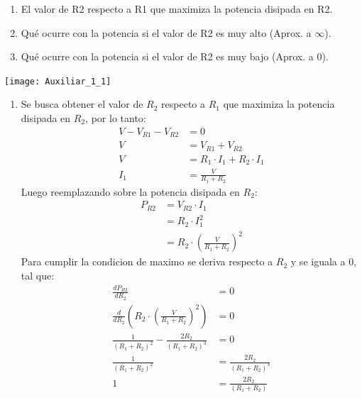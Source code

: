 \documentclass[
  11pt,
  letterpaper,
   addpoints,
  ]{exam}
\begin{document}
\begin{questions}
    \begin{enumerate}
        \item El valor de R2 respecto a R1 que maximiza la potencia disipada en R2.
        \item Qué ocurre con la potencia si el valor de R2 es muy alto (Aprox. a $\infty$).
        \item Qué ocurre con la potencia si el valor de R2 es muy bajo (Aprox. a 0).
    \end{enumerate}
    \begin{center}
        \texttt{[image: Auxiliar\_1\_1]}
    \end{center}
    \begin{solution}
        \begin{enumerate}
            \item Se busca obtener el valor de $R_2$ respecto a $R_{1}$ que maximiza la potencia disipada en $R_2$, por lo tanto:
            \begin{align}
            V - V_{R1} - V_{R2} &= 0\\
            V &= V_{R1} + V_{R2}\\
            V &= R_{1} \cdot I_{1} + R_{2} \cdot I_{1}\\
            I_{1} &= \frac{V}{R_{1} + R_{2}}
            \end{align}
            Luego reemplazando sobre la potencia disipada en $R_{2}$:
            \begin{align}
                P_{R2} &= V_{R2} \cdot I_{1}\\
                &= R_{2} \cdot I_{1}^{2}\\
                &= R_{2} \cdot \left( \frac{V}{R_{1} + R_{2}} \right)^{2}
            \end{align}
            Para cumplir la condicion de maximo se deriva respecto a $R_{2}$ y se iguala a 0, tal que:
            \begin{align}
                \frac{dP_{R2}}{dR_{2}} &= 0\\
                \frac{d}{dR_{2}} \left( R_{2} \cdot \left( \frac{V}{R_{1} + R_{2}} \right)^{2} \right) &= 0\\
                \frac{1}{(R_{1} + R_{2})^{2}} - \frac{2R_{2}}{(R_{1} + R_{2})^{3}} &= 0\\
                \frac{1}{(R_{1} + R_{2})^{2}} &= \frac{2R_{2}}{(R_{1} + R_{2})^{3}}\\
                1 &= \frac{2R_{2}}{(R_{1}+R_{2})}\\

\end{align}
\end{enumerate}
\end{solution}
\end{questions}
\end{document}
